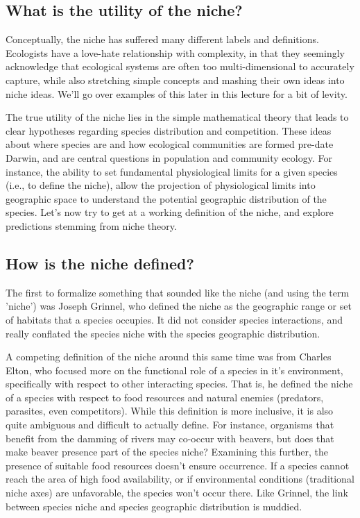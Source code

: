\documentclass[12pt]{article}
\begin{document}
\bigskip



\subsection*{What is the utility of the niche?}

Conceptually, the niche has suffered many different labels and definitions. Ecologists have a love-hate relationship with complexity, in that they seemingly acknowledge that ecological systems are often too multi-dimensional to accurately capture, while also stretching simple concepts and mashing their own ideas into niche ideas. We'll go over examples of this later in this lecture for a bit of levity. 

The true utility of the niche lies in the simple mathematical theory that leads to clear hypotheses regarding species distribution and competition. These ideas about where species are and how ecological communities are formed pre-date Darwin, and are central questions in population and community ecology. For instance, the ability to set fundamental physiological limits for a given species (i.e., to define the niche), allow the projection of physiological limits into geographic space to understand the potential geographic distribution of the species. Let's now try to get at a working definition of the niche, and explore predictions stemming from niche theory. 












\subsection*{How is the niche defined?} 

The first to formalize something that sounded like the niche (and using the term 'niche') was Joseph Grinnel, who defined the niche as the geographic range or set of habitats that a species occupies. It did not consider species interactions, and really conflated the species niche with the species geographic distribution. 

A competing definition of the niche around this same time was from Charles Elton, who focused more on the functional role of a species in it's environment, specifically with respect to other interacting species. That is, he defined the niche of a species with respect to food resources and natural enemies (predators, parasites, even competitors). While this definition is more inclusive, it is also quite ambiguous and difficult to actually define. For instance, organisms that benefit from the damming of rivers may co-occur with beavers, but does that make beaver presence part of the species niche? Examining this further, the presence of suitable food resources doesn't ensure occurrence. If a species cannot reach the area of high food availability, or if environmental conditions (traditional niche axes) are unfavorable, the species won't occur there. Like Grinnel, the link between species niche and species geographic distribution is muddied. 
\end{document}
